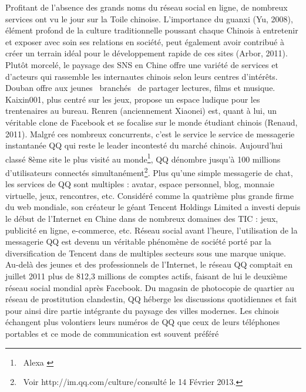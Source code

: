 {\color{black}
Profitant de l'absence des grands noms du r\'eseau social en ligne, de nombreux services ont vu le jour sur la Toile
chinoise. L'importance du guanxi (Yu, 2008), \'el\'ement profond de la culture traditionnelle poussant chaque Chinois
\`a entretenir et exposer avec soin ses relations en soci\'et\'e, peut \'egalement avoir contribu\'e \`a cr\'eer un
terrain id\'eal pour le d\'eveloppement rapide de ces sites (Arbor, 2011). Plut\^ot morcel\'e, le paysage des SNS en
Chine offre une vari\'et\'e de services et d'acteurs qui rassemble les internautes chinois selon leurs centres
d'int\'er\^ets. Douban offre aux jeunes {\guillemotleft}~branch\'es~{\guillemotright} de partager lectures, films et
musique. Kaixin001, plus centr\'e sur les jeux, propose un espace ludique pour les trentenaires au bureau. Renren
(anciennement Xiaonei) est, quant \`a lui, un v\'eritable clone de Facebook et se focalise sur le monde \'etudiant
chinois (Renaud, 2011). Malgr\'e ces nombreux concurrents, c'est le service le service de messagerie instantan\'ee QQ
qui reste le leader incontest\'e du march\'e chinois. Aujourd'hui class\'e 8\`eme site le plus visit\'e au
monde\footnote{\ Alexa\textcolor{black}{ }}, QQ d\'enombre jusqu'\`a 100 millions d'utilisateurs connect\'es
simultan\'ement\footnote{\ Voir http://im.qq.com/culture/\textstyleInternetlink{, }consult\'e le 14 F\'evrier 2013.}.
Plus qu'une simple messagerie de chat, les services de QQ sont multiples : avatar, espace personnel, blog, monnaie
virtuelle, jeux, rencontres, etc. Consid\'er\'e comme la quatri\`eme plus grande firme du web mondiale, son cr\'eateur
le g\'eant Tencent Holdings Limited a investi depuis le d\'ebut de l'Internet en Chine dans de nombreux domaines des
TIC : jeux, publicit\'e en ligne, e-commerce, etc. R\'eseau social avant l'heure, l'utilisation de la messagerie QQ est
devenu un v\'eritable ph\'enom\`ene de soci\'et\'e port\'e par la diversification de Tencent dans de multiples secteurs
sous une marque unique. Au-del\`a des jeunes et des professionnels de l'Internet, le r\'eseau QQ comptait en juillet
2011 plus de 812,3 millions de comptes actifs, faisant de lui le deuxi\`eme r\'eseau social mondial apr\`es Facebook.
Du magasin de photocopie de quartier au r\'eseau de prostitution clandestin, QQ h\'eberge les discussions quotidiennes
et fait pour ainsi dire partie int\'egrante du paysage des villes modernes. Les chinois \'echangent plus volontiers
leurs num\'eros de QQ que ceux de leurs t\'el\'ephones portables et ce mode de communication est souvent pr\'ef\'er\'e
}
